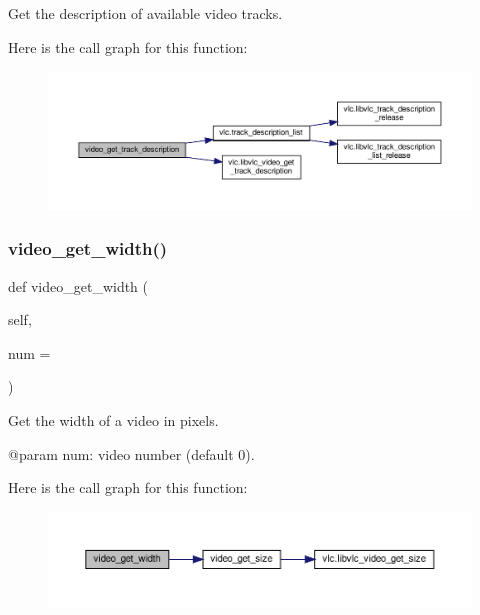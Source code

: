 \begin{DoxyVerb}Get the description of available video tracks.
\end{DoxyVerb}
 Here is the call graph for this function\+:
\nopagebreak
\begin{figure}[H]
\begin{center}
\leavevmode
\includegraphics[width=350pt]{classvlc_1_1_media_player_a93127aa157b1e8d516c2a2dd8c77db21_cgraph}
\end{center}
\end{figure}
\mbox{\label{classvlc_1_1_media_player_a48602f969d067204addde054bf19ac2a}} 
\subsubsection{\texorpdfstring{video\+\_\+get\+\_\+width()}{video\_get\_width()}}
{\footnotesize\ttfamily def video\+\_\+get\+\_\+width (\begin{DoxyParamCaption}\item[{}]{self,  }\item[{}]{num = {} }\end{DoxyParamCaption})}

\begin{DoxyVerb}Get the width of a video in pixels.

@param num: video number (default 0).
\end{DoxyVerb}
 Here is the call graph for this function\+:
\nopagebreak
\begin{figure}[H]
\begin{center}
\leavevmode
\includegraphics[width=350pt]{classvlc_1_1_media_player_a48602f969d067204addde054bf19ac2a_cgraph}
\end{center}
\end{figure}
\mbox{\label{classvlc_1_1_media_player_a8961d32c677daf7be108038c183fb911}} 
